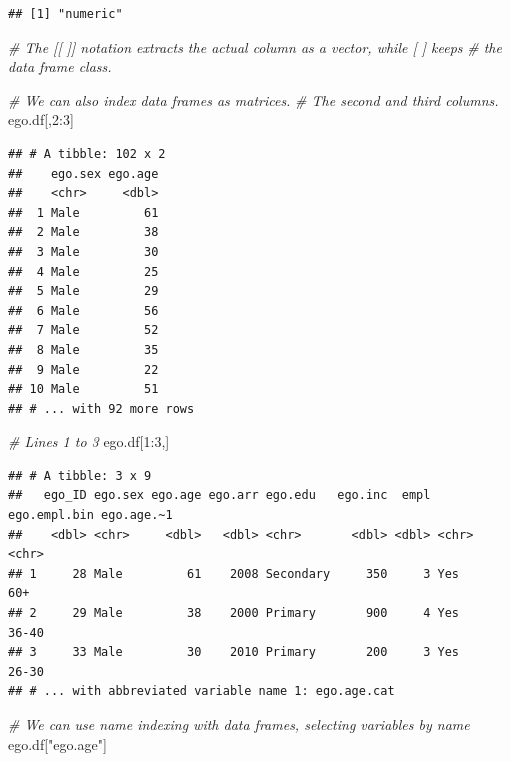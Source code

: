 \documentclass[
]{book}
\newenvironment{Shaded}{\begin{snugshade}}{\end{snugshade}}
\newcommand{\CommentTok}[1]{\textcolor[rgb]{0.56,0.35,0.01}{\textit{#1}}}
\newcommand{\DecValTok}[1]{\textcolor[rgb]{0.00,0.00,0.81}{#1}}
\newcommand{\NormalTok}[1]{#1}
\newcommand{\SpecialCharTok}[1]{\textcolor[rgb]{0.00,0.00,0.00}{#1}}
\newcommand{\StringTok}[1]{\textcolor[rgb]{0.31,0.60,0.02}{#1}}
\begin{document}
\begin{verbatim}
## [1] "numeric"
\end{verbatim}

\begin{Shaded}
\begin{Highlighting}[]
\CommentTok{\# The [[ ]] notation extracts the actual column as a vector, while [ ] keeps}
\CommentTok{\# the data frame class.}

\CommentTok{\# We can also index data frames as matrices.}
\CommentTok{\# The second and third columns.}
\NormalTok{ego.df[,}\DecValTok{2}\SpecialCharTok{:}\DecValTok{3}\NormalTok{]}
\end{Highlighting}
\end{Shaded}

\begin{verbatim}
## # A tibble: 102 x 2
##    ego.sex ego.age
##    <chr>     <dbl>
##  1 Male         61
##  2 Male         38
##  3 Male         30
##  4 Male         25
##  5 Male         29
##  6 Male         56
##  7 Male         52
##  8 Male         35
##  9 Male         22
## 10 Male         51
## # ... with 92 more rows
\end{verbatim}

\begin{Shaded}
\begin{Highlighting}[]
\CommentTok{\# Lines 1 to 3}
\NormalTok{ego.df[}\DecValTok{1}\SpecialCharTok{:}\DecValTok{3}\NormalTok{,]}
\end{Highlighting}
\end{Shaded}

\begin{verbatim}
## # A tibble: 3 x 9
##   ego_ID ego.sex ego.age ego.arr ego.edu   ego.inc  empl ego.empl.bin ego.age.~1
##    <dbl> <chr>     <dbl>   <dbl> <chr>       <dbl> <dbl> <chr>        <chr>     
## 1     28 Male         61    2008 Secondary     350     3 Yes          60+       
## 2     29 Male         38    2000 Primary       900     4 Yes          36-40     
## 3     33 Male         30    2010 Primary       200     3 Yes          26-30     
## # ... with abbreviated variable name 1: ego.age.cat
\end{verbatim}

\begin{Shaded}
\begin{Highlighting}[]
\CommentTok{\# We can use name indexing with data frames, selecting variables by name}
\NormalTok{ego.df[}\StringTok{"ego.age"}\NormalTok{]}
\end{Highlighting}
\end{Shaded}
\end{document}

